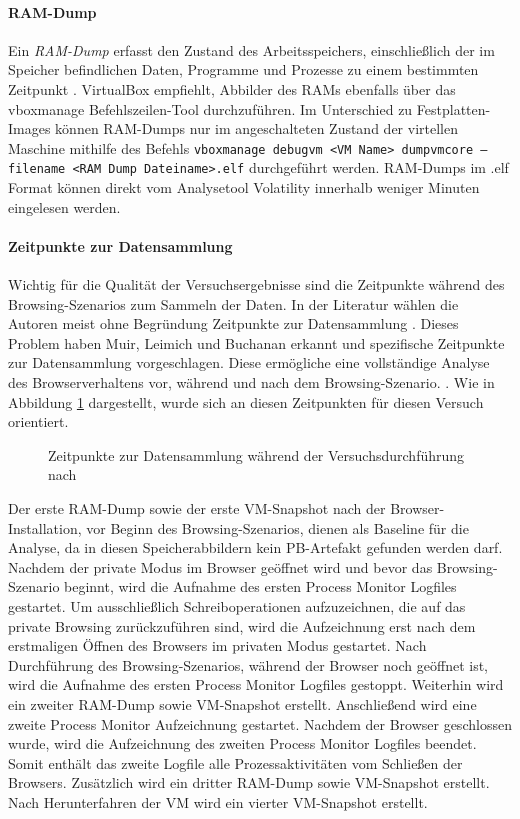 \paragraph*{RAM-Dump}
Ein \textit{RAM-Dump} erfasst den Zustand des Arbeitsspeichers, einschließlich der im Speicher befindlichen Daten, Programme und Prozesse zu einem bestimmten Zeitpunkt \cite{TILT.25.03.2023}.
VirtualBox empfiehlt, Abbilder des RAMs ebenfalls über das vboxmanage Befehlszeilen-Tool durchzuführen.
Im Unterschied zu Festplatten-Images können RAM-Dumps nur im angeschalteten Zustand der virtellen Maschine mithilfe des Befehls \texttt{vboxmanage debugvm <VM Name> dumpvmcore --filename <RAM Dump Dateiname>.elf} durchgeführt werden. RAM-Dumps im .elf Format können direkt vom Analysetool Volatility innerhalb weniger Minuten eingelesen werden.		

\paragraph*{Zeitpunkte zur Datensammlung}
Wichtig für die Qualität der Versuchsergebnisse sind die Zeitpunkte während des Browsing-Szenarios zum Sammeln der Daten.
In der Literatur wählen die Autoren meist ohne Begründung Zeitpunkte zur Datensammlung \cite{Sajan.2021, Nalawade.2016, Montasari.2015, Satvat.2014, Said.2011, Aggarwal.2010}.
Dieses Problem haben Muir, Leimich und Buchanan erkannt und spezifische Zeitpunkte zur Datensammlung vorgeschlagen. Diese ermögliche eine vollständige Analyse des Browserverhaltens vor, während und nach dem Browsing-Szenario. \cite{Muir.2019}. Wie in Abbildung \ref{img:zeitpunkte-datensammlung} dargestellt, wurde sich an diesen Zeitpunkten für diesen Versuch orientiert.
\begin{figure}[h!]
	\centering
	\small
	\centerline{\resizebox{\linewidth}{!}{}}
	\caption{Zeitpunkte zur Datensammlung während der Versuchsdurchführung nach \cite{Muir.2019}}
	\label{img:zeitpunkte-datensammlung}
\end{figure}

Der erste RAM-Dump sowie der erste VM-Snapshot nach der Browser-Installation, vor Beginn des Browsing-Szenarios, dienen als Baseline für die Analyse, da in diesen Speicherabbildern kein PB-Artefakt gefunden werden darf.
Nachdem der private Modus im Browser geöffnet wird und bevor das Browsing-Szenario beginnt, wird die Aufnahme des ersten Process Monitor Logfiles gestartet. Um ausschließlich Schreiboperationen aufzuzeichnen, die auf das private Browsing zurückzuführen sind, wird die Aufzeichnung erst nach dem erstmaligen Öffnen des Browsers im privaten Modus gestartet.
Nach Durchführung des Browsing-Szenarios, während der Browser noch geöffnet ist, wird die Aufnahme des ersten Process Monitor Logfiles gestoppt. Weiterhin wird ein zweiter RAM-Dump sowie VM-Snapshot erstellt. Anschließend wird eine zweite Process Monitor Aufzeichnung gestartet. 
Nachdem der Browser geschlossen wurde, wird die Aufzeichnung des zweiten Process Monitor Logfiles beendet. Somit enthält das zweite Logfile alle Prozessaktivitäten vom Schließen der Browsers. Zusätzlich wird ein dritter RAM-Dump sowie  VM-Snapshot erstellt. 
Nach Herunterfahren der VM wird ein vierter VM-Snapshot erstellt.

